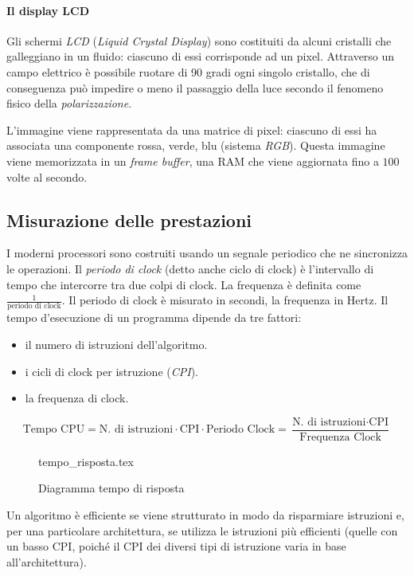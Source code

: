 \paragraph{Il display LCD}
Gli schermi \emph{LCD} (\emph{Liquid Crystal Display}) sono costituiti da alcuni cristalli che galleggiano in un fluido: ciascuno di essi corrisponde ad un pixel.
Attraverso un campo elettrico è possibile ruotare di 90 gradi ogni singolo cristallo, che di conseguenza può impedire o meno il passaggio della luce secondo il fenomeno fisico della \emph{polarizzazione}.

L'immagine viene rappresentata da una matrice di pixel: ciascuno di essi ha associata una componente rossa, verde, blu (sistema \emph{RGB}).
Questa immagine viene memorizzata in un \emph{frame buffer}, una RAM che viene aggiornata fino a \(100\) volte al secondo.

\subsection{Misurazione delle prestazioni}
I moderni processori sono costruiti usando un segnale periodico che ne sincronizza le operazioni. Il \emph{periodo di clock} (detto anche ciclo di clock) è l'intervallo di tempo che intercorre tra due colpi di clock. La frequenza è definita come \(\frac{1}{\text{periodo di clock}}\). Il periodo di clock è misurato in secondi, la frequenza in Hertz. Il tempo d'esecuzione di un programma dipende da tre fattori:
\begin{itemize}[nolistsep]
	\item il numero di istruzioni dell'algoritmo.
	\item i cicli di clock per istruzione (\emph{CPI}).
	\item la frequenza di clock.
\end{itemize}

\begin{equation*}
\text{Tempo CPU} = \text{N. di istruzioni} \cdot \text{CPI} \cdot \text{Periodo Clock} = \frac{\text{N. di istruzioni} \cdot \text{CPI}}{\text{Frequenza Clock}}
\end{equation*}

\begin{figure}[H]
	\centering
	{tempo_risposta.tex}
	\caption{Diagramma tempo di risposta}
\end{figure}

Un algoritmo è efficiente se viene strutturato in modo da risparmiare istruzioni e, per una particolare architettura, se utilizza le istruzioni più efficienti (quelle con un basso CPI, poiché il CPI dei diversi tipi di istruzione varia in base all'architettura).

